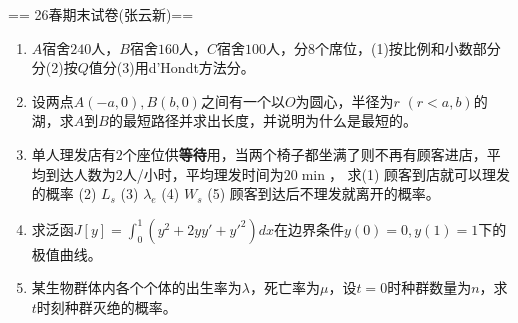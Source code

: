
== 26春期末试卷(张云新)==
\begin{enumerate}
    \item $A$宿舍$240$人，$B$宿舍$160$人，$C$宿舍$100$人，分$8$个席位，(1)按比例和小数部分分(2)按$Q$值分(3)用d'Hondt方法分。
    \item 设两点$A(-a,0),B(b,0)$之间有一个以$O$为圆心，半径为$r$ $(r<a,b)$的湖，求$A$到$B$的最短路径并求出长度，并说明为什么是最短的。
    \item 单人理发店有$2$个座位供\textbf{等待}用，当两个椅子都坐满了则不再有顾客进店，平均到达人数为$2$人/小时，平均理发时间为$20\min $，
    求(1) 顾客到店就可以理发的概率 (2) $L_s$ (3) $\lambda_{e}$ (4) $W_s$ (5) 顾客到达后不理发就离开的概率。
    \item 求泛函$J[y]=\int_0^1(y^2+2yy'+y'^2)dx$在边界条件$y(0)=0,y(1)=1$下的极值曲线。
    \item 某生物群体内各个个体的出生率为$\lambda$，死亡率为$\mu$，设$t=0$时种群数量为$n$，求$t$时刻种群灭绝的概率。
\end{enumerate}

